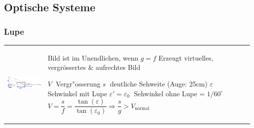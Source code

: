 \subsection{Optische Systeme}
\subsubsection{Lupe  }
\begin{tabular}{lll}
  \parbox{7cm}{\includegraphics[width=7cm]{./bilder/lupe.png}} &
  \parbox{11cm}{
    Bild ist im Unendlichen, wenn $g=f$\\
    Erzeugt virtuelles, vergrössertes \& aufrechtes Bild \\
    \\
    $V \;$ Vergr"osserung \qquad \qquad $s \;$ deutliche Sehweite (Auge: 25cm)\\
    \qquad $\varepsilon \;$ Sehwinkel mit Lupe \qquad $\varepsilon' = \varepsilon_0 \;$ Sehwinkel
    ohne Lupe = $1/60^\circ$\\
    $V=\dfrac{s}{f}=\dfrac{\tan(\varepsilon)}{\tan(\varepsilon_0)}\Rightarrow\dfrac{s}{g}>
    V_{\text{normal}}$ }
\end{tabular}

